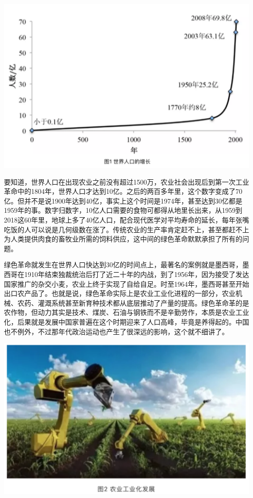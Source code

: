 \documentclass[]{book}
\begin{document}
\includegraphics[width=6.67in]{images/renkou1}

要知道，世界人口在出现农业之前没有超过1500万，农业社会出现后到第一次工业革命中的1804年，世界人口才达到10亿。之后的两百多年里，这个数字变成了70亿。但并不是说1900年达到40亿，事实上这个时间是1974年，甚至达到30亿都是1959年的事。数字归数字，10亿人口需要的食物可都得从地里长出来，从1959到2018这60年里，地球上多了40亿人口，配合现代医学对平均寿命的延长，每年张嘴吃饭的人可以说是几何级数在涨了。传统农业的生产率肯定赶不上，甚至都赶不上为人类提供肉食的畜牧业所需的饲料供应，这中间的绿色革命默默承担了所有的问题。

绿色革命就发生在世界人口快达到30亿的时间点上，最著名的案例就是墨西哥，墨西哥在1910年结束独裁统治后打了近二十年的内战，到了1956年，因为接受了发达国家推广的杂交小麦，农业上终于实现了自给自足。时至1964年，墨西哥甚至开始出口农产品了。也就是说，绿色革命实际上是农业工业化进程的一部分，农业机械、农药、灌溉系统甚至新育种技术都从底层推动了产量的提高。绿色革命革的是农作物，但动力其实是技术、煤炭、石油与钢铁而不是辛勤劳作，本质是农业工业化，后果就是发展中国家普遍在这个时期迎来了人口高峰，毕竟是养得起的。中国也不例外，不过那年代政治运动也产生了很深远的影响，这个就不细讲了。

\includegraphics[width=6.67in]{images/renkou2}
\end{document}
